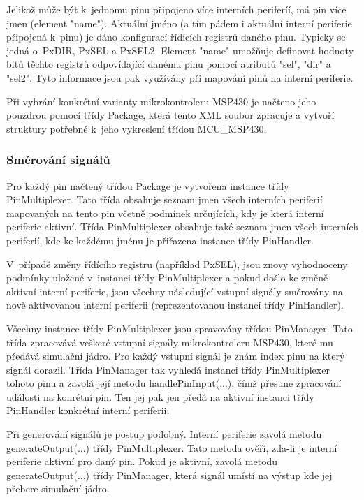 Jelikož může být k~jednomu pinu připojeno více interních periferíí, má pin více jmen (element "name"). Aktuální jméno (a tím pádem i aktuální interní periferie připojená k~pinu) je dáno konfigurací řídících registrů daného pinu. Typicky se jedná o~PxDIR, PxSEL a PxSEL2. Element "name" umožňuje definovat hodnoty bitů těchto registrů odpovídající danému pinu pomocí atributů "sel", "dir" a "sel2". Tyto informace jsou pak využívány při mapování pinů na interní periferie.

Při vybrání konkrétní varianty mikrokontroleru MSP430 je načteno jeho pouzdrou pomocí třídy Package, která tento XML soubor zpracuje a vytvoří struktury potřebné k~jeho vykreslení třídou MCU\_MSP430.

\subsubsection{Směrování signálů}

Pro každý pin načtený třídou Package je vytvořena instance třídy PinMultiplexer. Tato třída obsahuje seznam jmen všech interních periferií mapovaných na tento pin včetně podmínek určujících, kdy je která interní periferie aktivní. Třída PinMultiplexer obsahuje také seznam jmen všech interních periferií, kde ke každému jménu je přiřazena instance třídy PinHandler.

V~případě změny řídícího registru (například PxSEL), jsou znovy vyhodnoceny podmínky uložené v~instanci třídy PinMultiplexer a pokud došlo ke změně aktivní interní periferie, jsou všechny následující vstupní signály směrovány na nově aktivovanou interní periferii (reprezentovanou instancí třídy PinHandler).

Všechny instance třídy PinMultiplexer jsou spravovány třídou PinManager. Tato třída zpracovává veškeré vstupní signály mikrokontroleru MSP430, které mu předává simulační jádro. Pro každý vstupní signál je znám index pinu na který signál dorazil. Třída PinManager tak vyhledá instanci třídy PinMultiplexer tohoto pinu a zavolá její metodu handlePinInput(...), čímž přesune zpracování události na konrétní pin. Ten jej pak jen předá na aktivní instanci třídy PinHandler konkrétní interní periferii.

Při generování signálů je postup podobný. Interní periferie zavolá metodu generateOutput(...) třídy PinMultiplexer. Tato metoda ověří, zda-li je interní periferie aktivní pro daný pin. Pokud je aktivní, zavolá metodu generateOutput(...) třídy PinManager, která signál umístí na výstup kde jej přebere simulační jádro.

